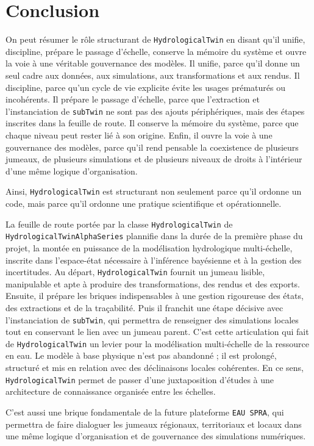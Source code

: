 \documentclass[11pt,a4paper]{article}
\newcommand{\hydrot}{\texttt{HydrologicalTwin}}
\newcommand{\subt}{\texttt{subTwin}}
\newcommand{\alphaht}{\texttt{HydrologicalTwinAlphaSeries}}
\newcommand{\eauspra}{\texttt{EAU SPRA}}
\begin{document}
\section{Conclusion}

On peut résumer le rôle structurant de \hydrot{} en disant qu'il unifie, discipline, prépare le passage d'échelle, conserve la mémoire du système et ouvre la voie à une véritable gouvernance des modèles. Il unifie, parce qu'il donne un seul cadre aux données, aux simulations, aux transformations et aux rendus. Il discipline, parce qu'un cycle de vie explicite évite les usages prématurés ou incohérents. Il prépare le passage d'échelle, parce que l'extraction et l'instanciation de \subt{} ne sont pas des ajouts périphériques, mais des étapes inscrites dans la feuille de route. Il conserve la mémoire du système, parce que chaque niveau peut rester lié à son origine. Enfin, il ouvre la voie à une gouvernance des modèles, parce qu'il rend pensable la coexistence de plusieurs jumeaux, de plusieurs simulations et de plusieurs niveaux de droits à l'intérieur d'une même logique d'organisation.

Ainsi, \hydrot{} est structurant non seulement parce qu'il ordonne un code, mais parce qu'il ordonne une pratique scientifique et opérationnelle.



La feuille de route portée par la classe \texttt{HydrologicalTwin} de \alphaht{} plannifie dans la durée de la première phase du projet, la montée en puissance  de la modélisation hydrologique multi-échelle, inscrite dans l'espace-état nécessaire à l'inférence bayésienne et à la gestion des incertitudes. Au départ, \hydrot{} fournit un jumeau lisible, manipulable et apte à produire des transformations, des rendus et des exports. Ensuite, il prépare les briques indispensables à une gestion rigoureuse des états, des extractions et de la traçabilité. Puis il franchit une étape décisive avec l'instanciation de \subt , qui permettra de renseigner des simulations locales tout en conservant le lien avec un jumeau parent. C'est cette articulation qui fait de \hydrot{} un levier pour la modélisation multi-échelle de la ressource en eau. Le modèle à base physique n'est pas abandonné ; il est prolongé, structuré et mis en relation avec des déclinaisons locales cohérentes. En ce sens, \hydrot{} permet de passer d'une juxtaposition d'études à une architecture de connaissance organisée entre les échelles. 

C'est aussi une brique fondamentale de la future plateforme \eauspra, qui permettra de faire dialoguer les jumeaux régionaux, territoriaux et locaux dans une même logique d'organisation et de gouvernance des simulations numériques.
\end{document}
